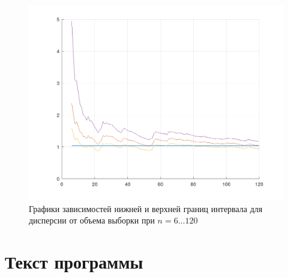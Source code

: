 \begin{figure}
	\centering
	\includegraphics[width=\linewidth]{img/screenshot002}
	\caption{Графики зависимостей нижней и верхней границ интервала для дисперсии от объема выборки при $n = 6\dots120$}
	\label{fig:screenshot002}
\end{figure}

\clearpage

\section{Текст программы}

